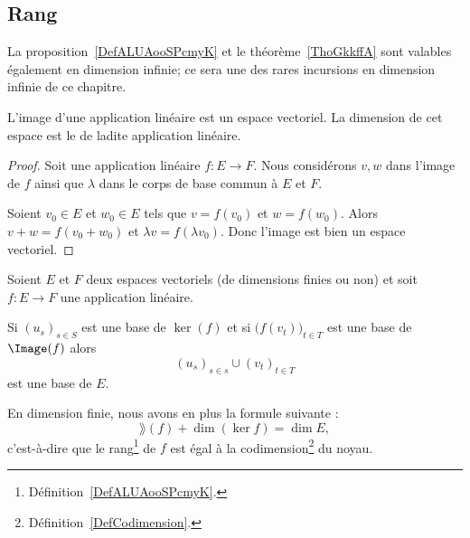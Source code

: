\subsection{Rang}

La proposition~\ref{DefALUAooSPcmyK} et le théorème~\ref{ThoGkkffA} sont valables également en dimension infinie; ce sera une des rares incursions en dimension infinie de ce chapitre.
\begin{propositionDef}\label{DefALUAooSPcmyK}
    L'image d'une application linéaire est un espace vectoriel. La dimension de cet espace est le  de ladite application linéaire.
\end{propositionDef}

\begin{proof}
    Soit une application linéaire \( f\colon E\to F\). Nous considérons \( v,w\) dans l'image de \( f\) ainsi que \( \lambda\) dans le corps de base commun à \( E\) et \( F\).

    Soient \( v_0\in E\) et \( w_0\in E\) tels que \( v=f(v_0)\) et \( w=f(w_0)\). Alors \( v+w=f(v_0+w_0)\) et \( \lambda v=f(\lambda v_0)\). Donc l'image est bien un espace vectoriel.
\end{proof}

\begin{theorem}       \label{ThoGkkffA}
    Soient \( E\) et \( F\) deux espaces vectoriels (de dimensions finies ou non) et soit \( f\colon E\to F\) une application linéaire. 
    
   Si \( (u_s)_{s\in S}\) est une base de \( \ker(f)\) et si \( \big( f(v_t) \big)_{t\in T}\) est une base de \( \Image(f)\) alors 
   \begin{equation}
   (u_s)_{s\in s}\cup (v_t)_{t\in T}
   \end{equation}
   est une base de \( E\).
    
   En dimension finie, nous avons en plus la formule suivante :
   \begin{equation}     \label{EQooUEOQooLySRiE}
       \rang(f)+\dim(\ker f)=\dim E,
   \end{equation}
   c'est-à-dire que le rang\footnote{Définition~\ref{DefALUAooSPcmyK}.} de \( f\) est égal à la codimension\footnote{Définition~\ref{DefCodimension}.} du noyau.
\end{theorem}

